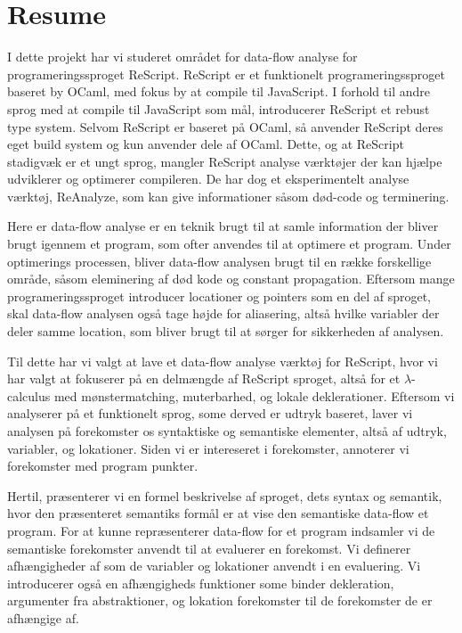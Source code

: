 \documentclass[../master.tex]{subfiles}
\begin{document}
\section*{Resume}
I dette projekt har vi studeret området for data-flow analyse for programeringssproget ReScript.
ReScript er et funktionelt programeringssproget baseret by OCaml, med fokus by at compile til JavaScript.
I forhold til andre sprog med at compile til JavaScript som mål, introducerer ReScript et rebust type system.
Selvom ReScript er baseret på OCaml, så anvender ReScript deres eget build system og kun anvender dele af OCaml.
Dette, og at ReScript stadigvæk er et ungt sprog, mangler ReScript analyse værktøjer der kan hjælpe udviklerer og optimerer compileren.
De har dog et eksperimentelt analyse værktøj, ReAnalyze, som kan give informationer såsom død-code og terminering.

Here er data-flow analyse er en teknik brugt til at samle information der bliver brugt igennem et program, som ofter anvendes til at optimere et program.
Under optimerings processen, bliver data-flow analysen brugt til en række forskellige område, såsom eleminering af død kode og constant propagation.
Eftersom mange programeringssproget introducer locationer og pointers som en del af sproget, skal data-flow analysen også tage højde for aliasering, altså hvilke variabler der deler samme location, som bliver brugt til at sørger for sikkerheden af analysen.
\bigskip

Til dette har vi valgt at lave et data-flow analyse værktøj for ReScript, hvor vi har valgt at fokuserer på en delmængde af ReScript sproget, altså for et $\lambda$-calculus med mønstermatching, muterbarhed, og lokale deklerationer.
Eftersom vi analyserer på et funktionelt sprog, some derved er udtryk baseret, laver vi analysen på forekomster os syntaktiske og semantiske elementer, altså af udtryk, variabler, og lokationer.
Siden vi er intereseret i forekomster, annoterer vi forekomster med program punkter.

Hertil, præsenterer vi en formel beskrivelse af sproget, dets syntax og semantik, hvor den præsenteret semantiks formål er at vise den semantiske data-flow et program.
For at kunne repræsenterer data-flow for et program indsamler vi de semantiske forekomster anvendt til at evaluerer en forekomst.
Vi definerer afhængigheder af som de variabler og lokationer anvendt i en evaluering.
Vi introducerer også en afhængigheds funktioner some binder dekleration, argumenter fra abstraktioner, og lokation forekomster til de forekomster de er afhængige af.
\end{document}
